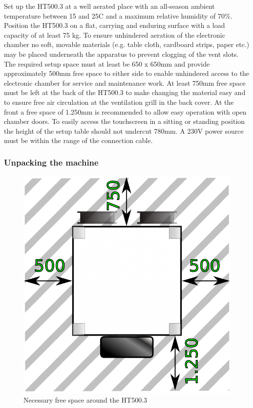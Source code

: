 Set up the HT500.3 at a well aerated place with an all-season ambient temperature between 15 and 25\degree C and a maximum relative humidity of 70\%.
Position the HT500.3 on a flat, carrying and enduring surface with a load capacity of at least 75 kg.
To ensure unhindered aeration of the electronic chamber no soft, movable materials (e.g. table cloth, cardboard strips, paper etc.) may be placed underneath the apparatus to prevent clogging of the vent slots.
The required setup space must at least be 650 x 650mm and provide approximately 500mm free space to either side to enable unhindered access to the electronic chamber for service and maintenance work. At least 750mm free space must be left at the back of the HT500.3 to make changing the material easy and to ensure free air circulation at the ventilation grill in the back cover. At the front a free space of 1.250mm is recommended to allow easy operation with open chamber doors.
To easily access the touchscreen in a sitting or standing position the height of the setup table should not undercut 780mm.
A 230V power source must be within the range of the connection cable. 


\subsubsection{Unpacking the machine}

\begin{figure}[H]
  \centering
  \includegraphics[width=.7\linewidth]{./img/workspace.png}
  \caption{Necessary free space around the HT500.3}
\end{figure}

